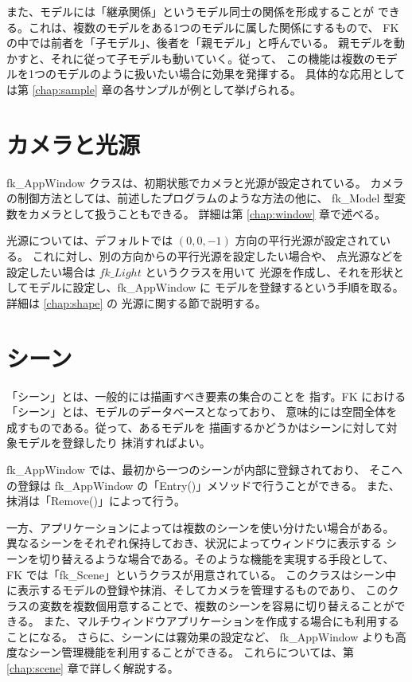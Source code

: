 また、モデルには「継承関係」というモデル同士の関係を形成することが
できる。これは、複数のモデルをある1つのモデルに属した関係にするもので、
FK の中では前者を「子モデル」、後者を「親モデル」と呼んでいる。
親モデルを動かすと、それに従って子モデルも動いていく。従って、
この機能は複数のモデルを1つのモデルのように扱いたい場合に効果を発揮する。
具体的な応用としては第 \ref{chap:sample} 章の各サンプルが例として挙げられる。

\section{カメラと光源}
fk\_AppWindow クラスは、初期状態でカメラと光源が設定されている。
カメラの制御方法としては、前述したプログラムのような方法の他に、
fk\_Model 型変数をカメラとして扱うこともできる。
詳細は第 \ref{chap:window} 章で述べる。

光源については、デフォルトでは \((0, 0, -1)\) 方向の平行光源が設定されている。
これに対し、別の方向からの平行光源を設定したい場合や、
点光源などを設定したい場合は \(fk\_Light\) というクラスを用いて
光源を作成し、それを形状としてモデルに設定し、fk\_AppWindow に
モデルを登録するという手順を取る。詳細は \ref{chap:shape} の
光源に関する節で説明する。

\section{シーン}

「シーン」とは、一般的には描画すべき要素の集合のことを
指す。FK における「シーン」とは、モデルのデータベースとなっており、
意味的には空間全体を成すものである。従って、あるモデルを
描画するかどうかはシーンに対して対象モデルを登録したり
抹消すればよい。

fk\_AppWindow では、最初から一つのシーンが内部に登録されており、
そこへの登録は fk\_AppWindow の「Entry()」メソッドで行うことができる。
また、抹消は「Remove()」によって行う。

一方、アプリケーションによっては複数のシーンを使い分けたい場合がある。
異なるシーンをそれぞれ保持しておき、状況によってウィンドウに表示する
シーンを切り替えるような場合である。そのような機能を実現する手段として、
FK では「fk\_Scene」というクラスが用意されている。
このクラスはシーン中に表示するモデルの登録や抹消、そしてカメラを管理するものであり、
このクラスの変数を複数個用意することで、複数のシーンを容易に切り替えることができる。
また、マルチウィンドウアプリケーションを作成する場合にも利用することになる。
さらに、シーンには霧効果の設定など、
fk\_AppWindow よりも高度なシーン管理機能を利用することができる。
これらについては、第 \ref{chap:scene} 章で詳しく解説する。

